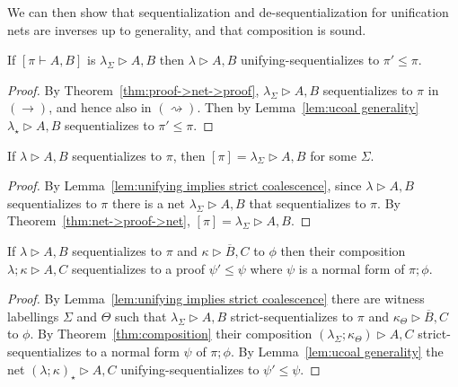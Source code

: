 \documentclass[UKenglish]{lipics-v2016}
\makeatletter
\theoremstyle{plain}
\newcommand\+{+}
\renewcommand\*{\times}
\newcommand\dual[1]{\overline{#1}}
\newcommand\seq[2]{{\vdash}#1,#2}
\newcommand\prf[3]{#1\vdash\!#2,#3}
\newcommand\Seq{\vphantom(\seq}
\newcommand\Prf[3]{\deduce{\Seq{#2}{#3}}{\vphantom(#1}}
\newcommand\net[3]{#1\triangleright #2,#3}
\newcommand\comp{\mathbin;}
\newcommand\scoal{\rightarrow} %
\newcommand\ucoal{\rightsquigarrow}
\newcommand\Qrr{\!\!\scriptstyle\qrr}
\newcommand\qrr[1]{
  \ifx#1+\expandafter\@qrr\else
  \ifx#1*\*\mathrm R\else
  \ifx#1!\forall\mathrm R\else
  \ifx#1?\expandafter\@@qrr\else
  \ifx#11\mathrm{ax}\else
  \ifx#1.\mathrm{cut}\else
  #1\mathrm R
  \fi\fi\fi\fi\fi\fi
}
\newcommand\@qrr[1]{+\mathrm R,#1}
\newcommand\@@qrr[1]{\exists\mathrm R,#1}
\makeatother
\begin{document}
We can then show that sequentialization and de-sequentialization for unification nets are inverses up to generality, and that composition is sound.

\begin{theorem}
If $[\prf\pi AB]$ is $\net{\lambda_\Sigma}AB$ then $\net\lambda AB$ unifying-sequentializes to $\pi'\leq \pi$.
\end{theorem}

\begin{proof}
By Theorem~\ref{thm:proof->net->proof}, $\net{\lambda_\Sigma}AB$ sequentializes to $\pi$ in $(\scoal)$, and hence also in $(\ucoal)$. Then by Lemma~\ref{lem:ucoal generality} $\net{\lambda_\star}AB$ sequentializes to $\pi'\leq\pi$.
\end{proof}


\begin{theorem}
If $\net\lambda AB$ sequentializes to $\pi$, then $[\pi]=\net{\lambda_\Sigma} AB$ for some $\Sigma$.
\end{theorem}

\begin{proof}
By Lemma~\ref{lem:unifying implies strict coalescence}, since $\net\lambda AB$ sequentializes to $\pi$ there is a net $\net{\lambda_\Sigma} AB$ that sequentializes to $\pi$. By Theorem~\ref{thm:net->proof->net}, $[\pi]=\net{\lambda_\Sigma} AB$.
\end{proof}


\begin{theorem}
If $\net\lambda AB$ sequentializes to $\pi$ and $\net\kappa{\dual B}C$ to $\phi$ then their composition $\net{\lambda\comp\kappa}AC$ sequentializes to a proof $\psi'\leq\psi$ where $\psi$ is a normal form of $\pi\comp\phi$.
\end{theorem}

\begin{proof}
By Lemma~\ref{lem:unifying implies strict coalescence} there are witness labellings $\Sigma$ and $\Theta$ such that $\net{\lambda_\Sigma}AB$ strict-sequentializes to $\pi$ and $\net{\kappa_\Theta}{\dual B}C$ to $\phi$. By Theorem~\ref{thm:composition} their composition $(\net{\lambda_\Sigma\comp\kappa_\Theta)}AC$ strict-sequentializes to a normal form $\psi$ of $\pi\comp\phi$. By Lemma~\ref{lem:ucoal generality} the net $\net{(\lambda\comp\kappa)_\star}AC$ unifying-sequentializes to $\psi'\leq\psi$.
\end{proof}
\end{document}
